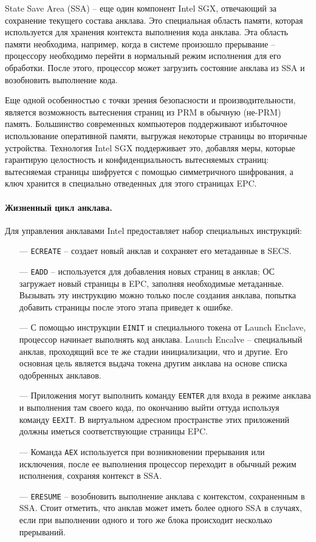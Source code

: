 State Save Area (SSA) -- еще один компонент Intel SGX, отвечающий за сохранение текущего состава анклава. Это специальная область памяти, которая используется для хранения контекста выполнения кода анклава. Эта область памяти необходима, например, когда в системе произошло прерывание -- процессору необходимо перейти в нормальный режим исполнения для его обработки. После этого, процессор может загрузить состояние анклава из SSA и возобновить выполнение кода.

Еще одной особенностью с точки зрения безопасности и производительности, является возможность вытеснения страниц из PRM в обычную (не-PRM) память. Большинство современных компьютеров поддерживают избыточное использование оперативной памяти, выгружая некоторые страницы во вторичные устройства. Технология Intel SGX поддерживает это, добавляя меры, которые гарантирую целостность и конфиденциальность вытесняемых страниц: вытесняемая страницы шифруется с помощью симметричного шифрования, а ключ хранится в специально отведенных для этого страницах EPC.

\paragraph{Жизненный цикл анклава.}

Для управления анклавами Intel предоставляет набор специальных инструкций:

\begin{itemize}
	\item [---] \texttt{ECREATE} -- создает новый анклав и сохраняет его метаданные в SECS.
	\item [---] \texttt{EADD} -- используется для добавления новых страниц в анклав; ОС загружает новый страницы в EPC, заполняя необходимые метаданные. Вызывать эту инструкцию можно только после создания анклава, попытка добавить страницы после этого этапа приведет к ошибке.
	\item [---] С помощью инструкции \texttt{EINIT} и специального токена от Launch Enclave, процессор начинает выполнять код анклава. Launch Encalve -- специальный анклав, проходящий все те же стадии инициализации, что и другие. Его основная цель является выдача токена другим анклава на основе списка одобренных анклавов.
	\item [---] Приложения могут выполнить команду \texttt{EENTER} для входа в режиме анклава и выполнения там своего кода, по окончанию выйти оттуда используя команду \texttt{EEXIT}. В виртуальном адресном пространстве этих приложений должны иметься соответствующие страницы EPC.
	\item [---] Команда \texttt{AEX} используется при возникновении прерывания или исключения, после ее выполнения процессор переходит в обычный режим исполнения, сохраняя контекст в SSA.
	\item [---] \texttt{ERESUME} -- возобновить выполнение анклава с контекстом, сохраненным в SSA. Стоит отметить, что анклав может иметь более одного SSA в случаях, если при выполнении одного и того же блока происходит несколько прерываний.
\end{itemize}

